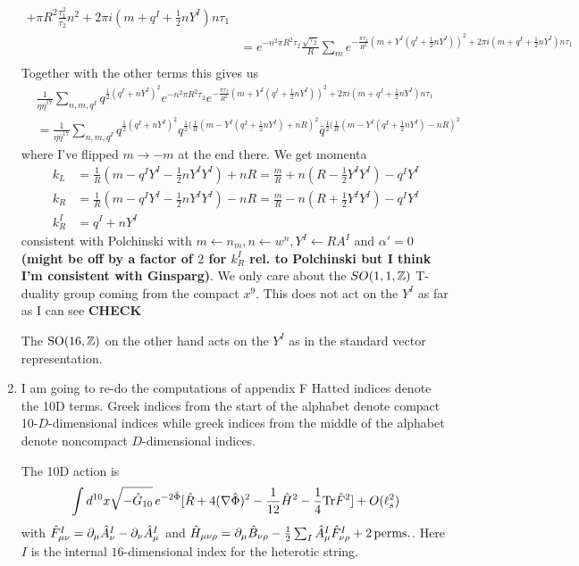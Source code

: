 \documentclass[11pt, class=article, crop=false]{standalone}
\begin{document}
\begin{enumerate}
\[\begin{aligned}
{			+ \pi R^2 \frac{\tau_1^2}{\tau_2} n^2
			+ 2 \pi i (m + q^I + \frac12 n Y^I) n  \tau_1}\\
			&= e^{- n^2 \pi R^2 \tau_2} \frac{\sqrt{\tau_2}}{R} \sum_{m}
			 e^{-\frac{\pi \tau_2}{R^2} (m + Y^I (q^I + \frac12 n Y^I) )^2 
			+ 2 \pi i (m + q^I + \frac12 n Y^I) n  \tau_1}\\
		\end{aligned}
		\]
		Together with the other terms this gives us
		\[
		\begin{aligned}
			&\frac{1}{\eta \bar \eta^{17}} \sum_{n, m, q^I} q^{\frac12 (q^I + n Y^I)^2}  e^{- n^2 \pi R^2 \tau_2}  e^{-\frac{\pi \tau_2}{R^2} (m + Y^I (q^I + \frac12 n Y^I) )^2 
			+ 2 \pi i (m + q^I + \frac12 n Y^I) n  \tau_1 } \\
			&= \frac{1}{\eta \bar \eta^{17}} \sum_{n, m, q^I} q^{\frac12 (q^I + n Y^I)^2} q^{\frac12 (\frac{1}{R} (m - Y^I (q^I + \frac12 n Y^I) + n R)^2} \bar q^{\frac12 ( \frac{1}{R} (m - Y^I (q^I + \frac12 n Y^I) - n R)^2}
		\end{aligned}
		\]
		where I've flipped $m \to -m$ at the end there. We get momenta 
		\[
		\begin{aligned}
			k_L &= \frac{1}{R}(m - q^I Y^I - \frac12 n Y^I Y^I) + n R = \frac{m}{R} + n (R - \frac12 Y^I Y^I) - q^I Y^I \\
			k_R &= \frac{1}{R}(m - q^I Y^I - \frac12 n Y^I Y^I ) - n R = \frac{m}{R} - n (R + \frac12 Y^I Y^I) - q^I Y^I\\
			k_R^I &= q^I + n Y^I 
		\end{aligned}
		\]
		consistent with Polchinski with $m \leftarrow n_m, n \leftarrow w^n, Y^I \leftarrow R A^I$ and $\alpha' = 0$ \textbf{(might be off by a factor of $2$ for $k_R^I$ rel. to Polchinski but I think I'm consistent with Ginsparg)}. We only care about the $SO(1,1, \mathbb{Z})$ T-duality group coming from the compact $x^9$. This does not act on the $Y^I$ as far as I can see \textbf{CHECK}
		
		The $\mathrm{SO}(16, \mathbb{Z})$ on the other hand acts on the $Y^I$ as in the standard vector representation. 
	
	
	\item I am going to re-do the computations of appendix F Hatted indices denote the 10D terms. Greek indices from the start of the alphabet denote compact 10-$D$-dimensional indices while greek indices from the middle of the alphabet denote noncompact $D$-dimensional indices.
	
	The 10D action is
	\[
		\int d^{10} x \sqrt{-\hat G_{10}} \,  e^{-2\hat \Phi} [\hat R + 4 (\nabla \hat \Phi)^2 - \frac{1}{12} \hat H^2 - \frac14 \mathrm{Tr} \hat F^2] + O(\ell_s^2)
	\]
	with $\hat F^I_{\mu \nu} = \partial_\mu \hat A^I_\nu - \partial_\nu \hat A^I_\mu$ and $\hat H_{\mu \nu \rho} = \partial_\mu \hat B_{\nu \rho} - \frac12 \sum_I \hat A_{\mu}^I \hat  F^I_{\nu \rho} + 2 \,\mathrm{perms.} $. Here $I$ is the internal $16$-dimensional index for the heterotic string. 
	

\end{enumerate}
\end{document}
